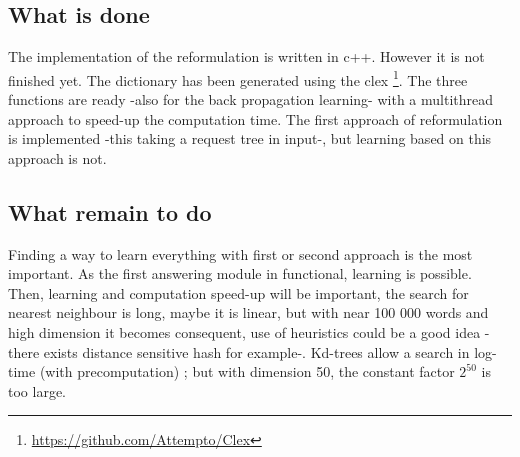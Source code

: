 \subsection{What is done}

The implementation of the reformulation is written in c++. However it is not finished yet. The dictionary has been generated using the clex \footnote{\url{https://github.com/Attempto/Clex}}. The three functions are ready -also for the back propagation learning- with a multithread approach to speed-up the computation time. The first approach of reformulation is implemented -this taking a request tree in input-, but learning based on this approach is not.

\subsection{What remain to do}

Finding a way to learn everything with first or second approach is the most important. As the first answering module in functional, learning is possible. Then, learning and computation speed-up will be important, the search for nearest neighbour is long, maybe it is linear, but with near 100 000 words and high dimension it becomes consequent, use of heuristics could be a good idea -there exists distance sensitive hash for example-. Kd-trees allow a search in log-time (with precomputation) ; but with dimension 50, the constant factor $2^{50}$ is too large. 

